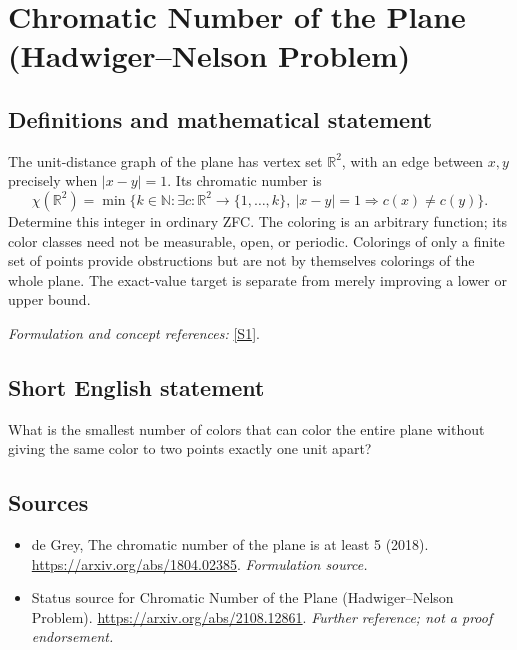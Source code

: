 \documentclass[11pt]{article}
\begin{document}
\section*{\texorpdfstring{Chromatic Number of the Plane (Hadwiger--Nelson Problem)}{Chromatic Number of the Plane (Hadwiger--Nelson Problem)}}\label{220}
\subsection{Definitions and mathematical statement}
The unit-distance graph of the plane has vertex set ${\mathbb{R}}^2$, with an edge between $x,y$ precisely when $|x-y|=1$. Its chromatic number is
\[
 \chi({\mathbb{R}}^2)=\min\{k\in{\mathbb{N}}:\exists c:{\mathbb{R}}^2\to\{1,\ldots,k\},
 \ |x-y|=1\Rightarrow c(x)\ne c(y)\}.
\]
Determine this integer in ordinary ZFC. The coloring is an arbitrary function; its color classes need not be measurable, open, or periodic. Colorings of only a finite set of points provide obstructions but are not by themselves colorings of the whole plane. The exact-value target is separate from merely improving a lower or upper bound.
\par\smallskip\textit{Formulation and concept references:} \href{https://arxiv.org/abs/1804.02385}{[S1]}.

\subsection{Short English statement}
What is the smallest number of colors that can color the entire plane without giving the same color to two points exactly one unit apart?
\subsection{Sources}
\begin{itemize}
\item[S1]de Grey, The chromatic number of the plane is at least 5 (2018).
\url{https://arxiv.org/abs/1804.02385}.
\textit{Formulation source.}
\item[S2]Status source for Chromatic Number of the Plane (Hadwiger--Nelson Problem).
\url{https://arxiv.org/abs/2108.12861}.
\textit{Further reference; not a proof endorsement.}
\end{itemize}
\end{document}
